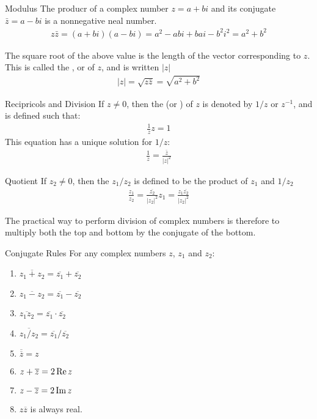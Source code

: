\documentclass[\main/notes.tex]{subfiles}
\begin{document}
			\begin{definition}{Modulus}
				The producr of a complex number $z = a + bi$ and its conjugate $\bar{z} = a - bi$ is a nonnegative neal number.
				\begin{align*}
					z\bar{z} = (a + bi)(a - bi) = a^{2} - abi + bai - b^{2}i^{2} = a^{2} + b^{2}
				\end{align*}

				The square root of the above value is the length of the vector corresponding to $z$. This is called the , or  of $z$, and is written $\left\lvert z \right\rvert$
				\begin{align*}
					\left\lvert z\right\rvert = \sqrt{z \bar{z}} = \sqrt{a^{2} + b^{2}}
				\end{align*}
			\end{definition}
			\begin{definition}{Recipricols and Division}
				If $z \neq 0$, then the  (or ) of $z$ is denoted by $1/z$ or $z^{-1}$, and is defined such that:
				\begin{align*}
					\frac{1}{z}z = 1
				\end{align*}
				This equation has a unique solution for $1/z$:
				\begin{align*}
					\frac{1}{z} = \frac{\bar{z}}{\left\lvert z\right\rvert^{2}}
				\end{align*}
			\end{definition}
			\begin{definition}{Quotient}
				If $z_{2} \neq 0$, then the  $z_{1}/z_{2}$ is defined to be the product of $z_{1}$ and $1/z_{2}$
				\begin{align*}
					\frac{z_{1}}{z_{2}} = \frac{\overline{z_{2}}}{\left\lvert z_{2}\right\rvert^{2}}z_{1} = \frac{z_{1}\overline{z_{2}}}{\left\lvert z_{2}\right\rvert^{2}}
				\end{align*}

				The practical way to perform division of complex numbers is therefore to multiply both the top and bottom by the conjugate of the bottom.
			\end{definition}
			\pagebreak
			\begin{sidenote}{Conjugate Rules}
				For any complex numbers $z$, $z_{1}$ and $z_{2}$:
				\begin{enumerate}[label=(\alph*)]
					\item $\overline{z_{1} + z_{2}} = \overline{z_{1}} + \overline{z_{2}}$
					\item $\overline{z_{1} - z_{2}} = \overline{z_{1}} - \overline{z_{2}}$
					\item $\overline{z_{1}z_{2}} = \overline{z_{1}} \cdot \overline{z_{2}}$
					\item $\overline{z_{1}/z_{2}} = \overline{z_{1}} / \overline{z_{2}}$
					\item $\overline{\overline{z}} = z$
					\item $z + \overline{z} = 2 \operatorname{Re}{z}$
					\item $z - \overline{z} = 2 \operatorname{Im}{z}$
					\item $z\overline{z}$ is always real.
				\end{enumerate}
			\end{sidenote}
\end{document}
